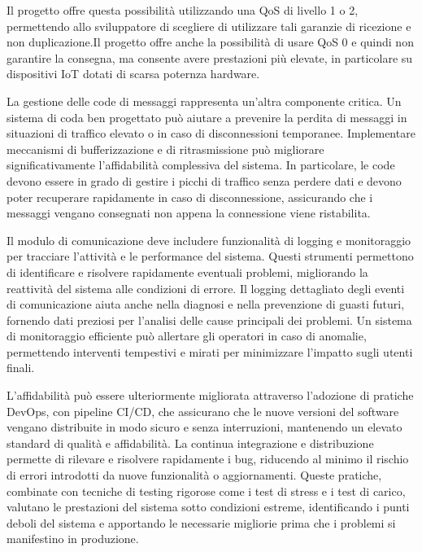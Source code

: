 \documentclass[12pt,a4paper,openright,twoside]{book}
\begin{document}
Il progetto offre questa possibilità utilizzando una \ac{QoS} di livello 1 o 2, permettendo allo sviluppatore di scegliere di utilizzare tali garanzie di ricezione 
e non duplicazione.Il progetto offre anche la possibilità di usare \ac{QoS} 0 e quindi non garantire la consegna, ma consente avere prestazioni più elevate, 
in particolare su dispositivi \ac{IoT} dotati di scarsa poternza hardware.

La gestione delle code di messaggi rappresenta un'altra componente critica. Un sistema di coda ben progettato può aiutare a prevenire la perdita di messaggi in 
situazioni di traffico elevato o in caso di disconnessioni temporanee. Implementare meccanismi di bufferizzazione e di ritrasmissione può migliorare significativamente 
l'affidabilità complessiva del sistema. In particolare, le code devono essere in grado di gestire i picchi di traffico senza perdere dati e devono poter recuperare 
rapidamente in caso di disconnessione, assicurando che i messaggi vengano consegnati non appena la connessione viene ristabilita.

Il modulo di comunicazione deve includere funzionalità di logging e monitoraggio per tracciare l'attività e le performance del sistema. Questi strumenti permettono 
di identificare e risolvere rapidamente eventuali problemi, migliorando la reattività del sistema alle condizioni di errore. Il logging dettagliato degli eventi di 
comunicazione aiuta anche nella diagnosi e nella prevenzione di guasti futuri, fornendo dati preziosi per l'analisi delle cause principali dei problemi. 
Un sistema di monitoraggio efficiente può allertare gli operatori in caso di anomalie, permettendo interventi tempestivi e mirati per minimizzare l'impatto sugli utenti finali.

L'affidabilità può essere ulteriormente migliorata attraverso l'adozione di pratiche DevOps, con pipeline \ac{CI/CD}, che assicurano che le nuove versioni del software 
vengano distribuite in modo sicuro e senza interruzioni, mantenendo un elevato standard di qualità e affidabilità. La continua integrazione e distribuzione permette di 
rilevare e risolvere rapidamente i bug, riducendo al minimo il rischio di errori introdotti da nuove funzionalità o aggiornamenti. Queste pratiche, combinate con tecniche 
di testing rigorose come i test di stress e i test di carico, valutano le prestazioni del sistema sotto condizioni estreme, identificando i punti deboli del sistema e 
apportando le necessarie migliorie prima che i problemi si manifestino in produzione.
\end{document}
